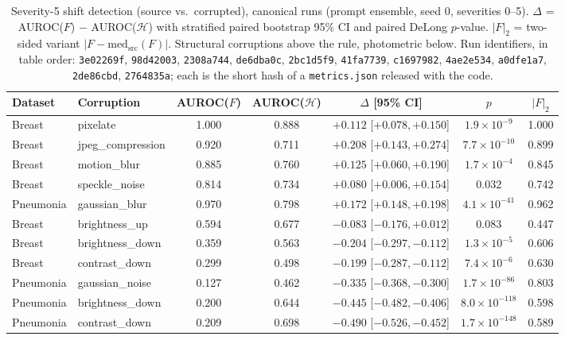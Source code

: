 \documentclass[11pt]{article}
\newcommand{\Hent}{\mathcal{H}}
\begin{document}
\begin{table}[t]
\centering
\small
\caption{Severity-5 shift detection (source vs.\ corrupted), canonical runs
(prompt ensemble, seed 0, severities 0--5). $\Delta$ = AUROC($F$) $-$
AUROC($\Hent$) with stratified paired bootstrap 95\% CI and paired DeLong
$p$-value. $|F|_2$ = two-sided variant $|F-\mathrm{med}_{\mathrm{src}}(F)|$.
Structural corruptions above the rule, photometric below. Run identifiers, in
table order: \texttt{3e02269f}, \texttt{98d42003}, \texttt{2308a744},
\texttt{de6dba0c}, \texttt{2bc1d5f9}, \texttt{41fa7739}, \texttt{c1697982},
\texttt{4ae2e534}, \texttt{a0dfe1a7}, \texttt{2de86cbd}, \texttt{2764835a};
each is the short hash of a \texttt{metrics.json} released with the code.}
\label{tab:main}
\begin{tabular}{llccccc}
\toprule
Dataset & Corruption & AUROC($F$) & AUROC($\Hent$) & $\Delta$ [95\% CI] & $p$ & $|F|_2$ \\
\midrule
Breast & pixelate          & 1.000 & 0.888 & $+0.112$ [$+0.078,+0.150$] & $1.9\!\times\!10^{-9}$ & 1.000 \\
Breast & jpeg\_compression & 0.920 & 0.711 & $+0.208$ [$+0.143,+0.274$] & $7.7\!\times\!10^{-10}$ & 0.899 \\
Breast & motion\_blur      & 0.885 & 0.760 & $+0.125$ [$+0.060,+0.190$] & $1.7\!\times\!10^{-4}$ & 0.845 \\
Breast & speckle\_noise    & 0.814 & 0.734 & $+0.080$ [$+0.006,+0.154$] & $0.032$ & 0.742 \\
Pneumonia & gaussian\_blur  & 0.970 & 0.798 & $+0.172$ [$+0.148,+0.198$] & $4.1\!\times\!10^{-41}$ & 0.962 \\
\midrule
Breast & brightness\_up    & 0.594 & 0.677 & $-0.083$ [$-0.176,+0.012$] & $0.083$ & 0.447 \\
Breast & brightness\_down  & 0.359 & 0.563 & $-0.204$ [$-0.297,-0.112$] & $1.3\!\times\!10^{-5}$ & 0.606 \\
Breast & contrast\_down    & 0.299 & 0.498 & $-0.199$ [$-0.287,-0.112$] & $7.4\!\times\!10^{-6}$ & 0.630 \\
Pneumonia & gaussian\_noise & 0.127 & 0.462 & $-0.335$ [$-0.368,-0.300$] & $1.7\!\times\!10^{-86}$ & 0.803 \\
Pneumonia & brightness\_down & 0.200 & 0.644 & $-0.445$ [$-0.482,-0.406$] & $8.0\!\times\!10^{-118}$ & 0.598 \\
Pneumonia & contrast\_down  & 0.209 & 0.698 & $-0.490$ [$-0.526,-0.452$] & $1.7\!\times\!10^{-148}$ & 0.589 \\
\bottomrule
\end{tabular}
\end{table}
\end{document}

